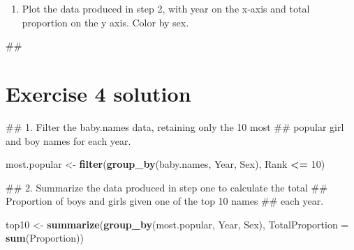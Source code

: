 \documentclass[]{book}
\newenvironment{Shaded}{\begin{snugshade}}{\end{snugshade}}
\newcommand{\KeywordTok}[1]{\textcolor[rgb]{0.13,0.29,0.53}{\textbf{#1}}}
\newcommand{\DataTypeTok}[1]{\textcolor[rgb]{0.13,0.29,0.53}{#1}}
\newcommand{\DecValTok}[1]{\textcolor[rgb]{0.00,0.00,0.81}{#1}}
\newcommand{\StringTok}[1]{\textcolor[rgb]{0.31,0.60,0.02}{#1}}
\newcommand{\OperatorTok}[1]{\textcolor[rgb]{0.81,0.36,0.00}{\textbf{#1}}}
\newcommand{\NormalTok}[1]{#1}
\providecommand{\tightlist}{%
  \setlength{\itemsep}{0pt}\setlength{\parskip}{0pt}}
\begin{document}
\begin{enumerate}
\def\labelenumi{\arabic{enumi}.}
\setcounter{enumi}{2}
\tightlist
\item
  Plot the data produced in step 2, with year on the x-axis and total
  proportion on the y axis. Color by sex.
\end{enumerate}

\begin{Shaded}
\begin{Highlighting}[]
\NormalTok{##}
\end{Highlighting}
\end{Shaded}

\section{Exercise 4 solution}\label{exercise-4-solution-1}

\begin{Shaded}
\begin{Highlighting}[]
\NormalTok{## 1.  Filter the baby.names data, retaining only the 10 most }
\NormalTok{##     popular girl and boy names for each year.}
\end{Highlighting}
\end{Shaded}

\begin{Shaded}
\begin{Highlighting}[]
\NormalTok{most.popular <-}\StringTok{ }\KeywordTok{filter}\NormalTok{(}\KeywordTok{group_by}\NormalTok{(baby.names, Year, Sex),}
\NormalTok{                       Rank }\OperatorTok{<=}\StringTok{ }\DecValTok{10}\NormalTok{)}
\end{Highlighting}
\end{Shaded}

\begin{Shaded}
\begin{Highlighting}[]
\NormalTok{## 2.  Summarize the data produced in step one to calculate the total}
\NormalTok{##     Proportion of boys and girls given one of the top 10 names}
\NormalTok{##     each year.}
\end{Highlighting}
\end{Shaded}

\begin{Shaded}
\begin{Highlighting}[]
\NormalTok{top10 <-}\StringTok{ }\KeywordTok{summarize}\NormalTok{(}\KeywordTok{group_by}\NormalTok{(most.popular, Year, Sex),}
                   \DataTypeTok{TotalProportion =} \KeywordTok{sum}\NormalTok{(Proportion))}
\end{Highlighting}
\end{Shaded}
\end{document}
